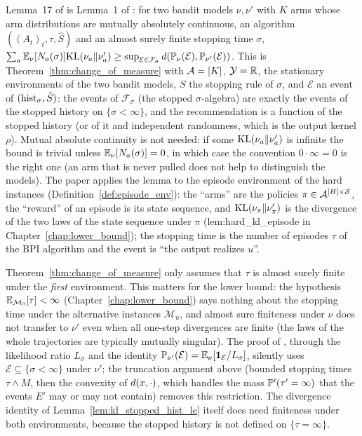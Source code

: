 \begin{remark}\label{rem:pinfo_paper_lemma}
Lemma~17 of \cite{essakine2026tight} is Lemma~1 of \cite{kaufmann2016complexity}: for two
bandit models $\nu, \nu'$ with $K$ arms whose arm distributions are mutually absolutely
continuous, an algorithm $((A_t)_t, \tau, \hat S)$ and an almost surely finite stopping time
$\sigma$, $\sum_a \mathbb{E}_\nu[N_a(\sigma)]\mathrm{KL}(\nu_a\|\nu'_a) \ge \sup_{\mathcal E\in\mathcal F_\sigma}
d(\mathbb{P}_\nu(\mathcal E), \mathbb{P}_{\nu'}(\mathcal E))$. This is
Theorem~\ref{thm:change_of_measure} with $\mathcal{A} = [K]$, $\mathcal Y = \mathbb{R}$, the stationary
environments of the two bandit models, $S$ the stopping rule of $\sigma$, and $\mathcal E$ an
event of $(\mathrm{hist}_\sigma, \hat S)$: the events of $\mathcal F_\sigma$ (the stopped
$\sigma$-algebra) are exactly the events of the stopped history on $\{\sigma < \infty\}$, and the
recommendation is a function of the stopped history (or of it and independent randomness, which
is the output kernel $\rho$). Mutual absolute continuity is not needed: if some
$\mathrm{KL}(\nu_a\|\nu'_a)$ is infinite the bound is trivial unless $\mathbb{E}_\nu[N_a(\sigma)] = 0$, in which
case the convention $0\cdot\infty = 0$ is the right one (an arm that is never pulled does not
help to distinguish the models). The paper applies the lemma to the episode environment of the
hard instances (Definition~\ref{def:episode_env}): the ``arms'' are the policies
$\pi \in \mathcal{A}^{[H]\times\mathcal{S}}$, the ``reward'' of an episode is its state sequence, and
$\mathrm{KL}(\nu_\pi\|\nu'_\pi)$ is the divergence of the two laws of the state sequence under $\pi$
(lem:hard\_kl\_episode in Chapter~\ref{chap:lower_bound}); the stopping time is the number of
episodes $\tau$ of the BPI algorithm and the event is ``the output realizes $u$''.
\end{remark}

\begin{remark}\label{rem:pinfo_one_sided}
Theorem~\ref{thm:change_of_measure} only assumes that $\tau$ is almost surely finite under
the \emph{first} environment. This matters for the lower bound: the hypothesis
$\mathbb{E}_{\mathcal M_0}[\tau] < \infty$ (Chapter~\ref{chap:lower_bound}) says nothing about the
stopping time under the alternative instances $\mathcal M_u$, and almost sure finiteness under
$\nu$ does not transfer to $\nu'$ even when all one-step divergences are finite (the laws of
the whole trajectories are typically mutually singular). The proof of
\cite{kaufmann2016complexity}, through the likelihood ratio $L_\sigma$ and the identity
$\mathbb{P}_{\nu'}(\mathcal E) = \mathbb{E}_\nu[\mathbf{1}_{\mathcal E}/L_\sigma]$, silently uses
$\mathcal E \subseteq \{\sigma < \infty\}$ under $\nu'$; the truncation argument above (bounded
stopping times $\tau\wedge M$, then the convexity of $d(x,\cdot)$, which handles the
mass $\mathbb{P}'(\tau' = \infty)$ that the events $E'$ may or may not contain) removes this
restriction. The divergence identity of Lemma~\ref{lem:kl_stopped_hist_le} itself does need
finiteness under both environments, because the stopped history is not defined on
$\{\tau = \infty\}$.
\end{remark}
